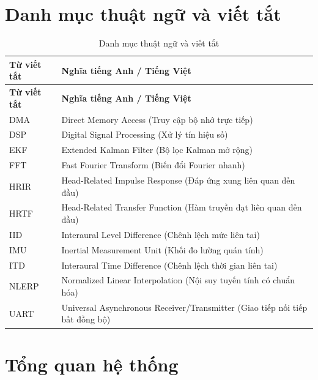 \chapter*{Danh mục thuật ngữ và viết tắt}
\begin{longtable}{ll}
    \caption{Danh mục thuật ngữ và viết tắt} \label{tab:abbreviations} \\
    \toprule
    \textbf{Từ viết tắt} & \textbf{Nghĩa tiếng Anh / Tiếng Việt} \\
    \midrule
    \endfirsthead
    \toprule
    \textbf{Từ viết tắt} & \textbf{Nghĩa tiếng Anh / Tiếng Việt} \\
    \midrule
    \endhead
    \bottomrule
    \endfoot
    DMA & Direct Memory Access (Truy cập bộ nhớ trực tiếp) \\
    DSP & Digital Signal Processing (Xử lý tín hiệu số) \\
    EKF & Extended Kalman Filter (Bộ lọc Kalman mở rộng) \\
    FFT & Fast Fourier Transform (Biến đổi Fourier nhanh) \\
    HRIR & Head-Related Impulse Response (Đáp ứng xung liên quan đến đầu) \\
    HRTF & Head-Related Transfer Function (Hàm truyền đạt liên quan đến đầu) \\
    IID & Interaural Level Difference (Chênh lệch mức liên tai) \\
    IMU & Inertial Measurement Unit (Khối đo lường quán tính) \\
    ITD & Interaural Time Difference (Chênh lệch thời gian liên tai) \\
    NLERP & Normalized Linear Interpolation (Nội suy tuyến tính có chuẩn hóa) \\
    UART & Universal Asynchronous Receiver/Transmitter (Giao tiếp nối tiếp bất đồng bộ) \\
\end{longtable}
\newpage

\chapter{Tổng quan hệ thống}

